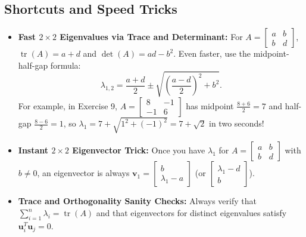 \documentclass[11pt, letterpaper]{article}
\theoremstyle{definition}
\theoremstyle{remark}
\begin{document}
\subsection{Shortcuts and Speed Tricks}
\begin{itemize}
    \item \textbf{Fast $2 \times 2$ Eigenvalues via Trace and Determinant:} For $A = \begin{bmatrix} a & b \\ b & d \end{bmatrix}$, $\operatorname{tr}(A) = a+d$ and $\det(A) = ad - b^2$. Even faster, use the midpoint-half-gap formula:
    \[
    \lambda_{1,2} = \frac{a+d}{2} \pm \sqrt{\left(\frac{a-d}{2}\right)^2 + b^2}.
    \]
    For example, in Exercise 9, $A = \begin{bmatrix} 8 & -1 \\ -1 & 6 \end{bmatrix}$ has midpoint $\frac{8+6}{2} = 7$ and half-gap $\frac{8-6}{2} = 1$, so $\lambda_1 = 7 + \sqrt{1^2 + (-1)^2} = 7 + \sqrt{2}$ in two seconds!
    \item \textbf{Instant $2 \times 2$ Eigenvector Trick:} Once you have $\lambda_1$ for $A = \begin{bmatrix} a & b \\ b & d \end{bmatrix}$ with $b \ne 0$, an eigenvector is always $\mathbf{v}_1 = \begin{bmatrix} b \\ \lambda_1 - a \end{bmatrix}$ (or $\begin{bmatrix} \lambda_1 - d \\ b \end{bmatrix}$).
    \item \textbf{Trace and Orthogonality Sanity Checks:} Always verify that $\sum_{i=1}^n \lambda_i = \operatorname{tr}(A)$ and that eigenvectors for distinct eigenvalues satisfy $\mathbf{u}_i^T \mathbf{u}_j = 0$.
\end{itemize}
\end{document}

